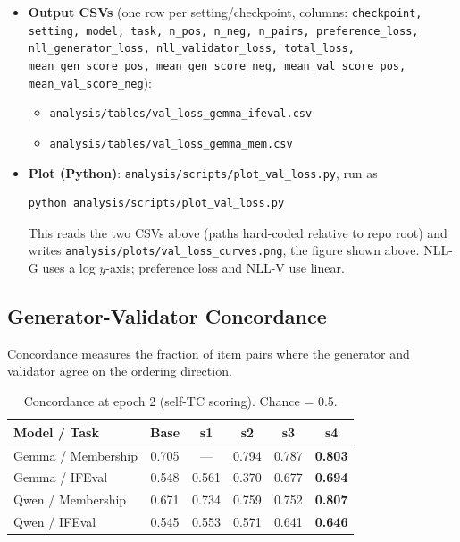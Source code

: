 \documentclass[11pt,a4paper]{article}
\begin{document}
\begin{itemize}
\begin{verbatim}
# Membership val-loss, evaluated on rosch (5 jobs: 44831-44835, ~14m each)
TASK=membership-sans-rosch-v0 \
TEST_TASK=rosch-all \
OUTPUT=analysis/tables/val_loss_gemma_mem.csv \
bash scripts/run_val_loss.sh
\end{verbatim}
Both runs use the default \texttt{MODEL=google/gemma-2-9b-it}, \texttt{MODELS\_DIR=/datastor2/jdr/rankalign/models2-rerun-wandb}, and \texttt{SETTINGS="s1 s2 s3 s4 s7"}.
\item \textbf{Output CSVs} (one row per setting/checkpoint, columns: \texttt{checkpoint, setting, model, task, n\_pos, n\_neg, n\_pairs, preference\_loss, nll\_generator\_loss, nll\_validator\_loss, total\_loss, mean\_gen\_score\_pos, mean\_gen\_score\_neg, mean\_val\_score\_pos, mean\_val\_score\_neg}):
\begin{itemize}
\item \texttt{analysis/tables/val\_loss\_gemma\_ifeval.csv}
\item \texttt{analysis/tables/val\_loss\_gemma\_mem.csv}
\end{itemize}
\item \textbf{Plot (Python)}: \texttt{analysis/scripts/plot\_val\_loss.py}, run as
\begin{verbatim}
python analysis/scripts/plot_val_loss.py
\end{verbatim}
This reads the two CSVs above (paths hard-coded relative to repo root) and writes \texttt{analysis/plots/val\_loss\_curves.png}, the figure shown above. NLL-G uses a log $y$-axis; preference loss and NLL-V use linear.
\end{itemize}

\subsection{Generator-Validator Concordance}

Concordance measures the fraction of item pairs where the generator and validator agree on the ordering direction.

\begin{table}[H]
\centering
\caption{Concordance at epoch 2 (self-TC scoring). Chance = 0.5.}
\label{tab:concordance}
\begin{tabular}{lccccc}
\toprule
\textbf{Model / Task} & \textbf{Base} & \textbf{s1} & \textbf{s2} & \textbf{s3} & \textbf{s4} \\
\midrule
Gemma / Membership & 0.705 & --- & 0.794 & 0.787 & \textbf{0.803} \\
Gemma / IFEval & 0.548 & 0.561 & 0.370 & 0.677 & \textbf{0.694} \\
Qwen / Membership & 0.671 & 0.734 & 0.759 & 0.752 & \textbf{0.807} \\
Qwen / IFEval & 0.545 & 0.553 & 0.571 & 0.641 & \textbf{0.646} \\
\bottomrule
\end{tabular}
\end{table}
\end{document}
